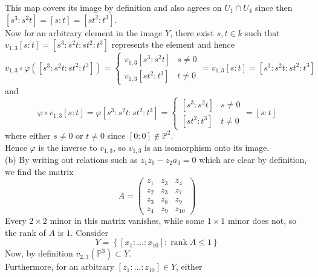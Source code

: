 \documentclass[a4paper]{article}
\DeclareMathOperator{\rank}{rank}
\begin{document}
     This map covers its image by definition and 
     also agrees on $U_1 \cap U_4$ since
     then
     $\left[ s^3 : s^2 t \right] 
     = \left[ s : t \right] 
     = \left[ s t^2 : t^3\right] $.\\
     \linebreak
     Now for an arbitrary element in the
     image $Y$, there exist $s,t \in k$ such that
     $v_{1,3} [s:t] = 
     \left[ s^3 : s^2 t : s t^2 : t^3 \right] $ represents
     the element and hence
     \[
     v_{1,3} \circ \varphi
     (\left[ s^3 : s^2 t : s t^2 : t^3 \right] )
     = \begin{cases}
         v_{1,3} \left[ s^3 : s^2 t \right] & s\neq 0\\
         v_{1,3} \left[ s t^2  : t^3 \right] & t\neq 0
     \end{cases}
     = v_{1,3} \left[ s : t \right] 
     = \left[ s^3 : s^2 t : s t^2 : t^3 \right]     
     \] 
     and
     \[
     \varphi \circ v_{1,3} \left[ s:t \right] 
     = \varphi \left[ s^3 : s^2 t : s t^2 : t^3 \right] 
     = \begin{cases}
         \left[ s^3 : s^2 t \right] & s\neq 0\\
         \left[ s t^2 : t^3 \right] & t\neq 0
     \end{cases}
     = \left[ s:t \right] 
     \] 
     where either $s \neq 0$ or $t \neq 0$ since
     $\left[ 0 : 0 \right]  \not\in  \mathbb{P}^2$.\\
     Hence $\varphi$ is the inverse to $v_{1,3}$, so
     $v_{1,3}$ is an isomorphism onto its image.\\
     \linebreak
     (b) By writing out relations such as
     $z_1 z_6 - z_2 a_3 = 0$ which are clear by definition, we
     find the matrix
     \[
         A = \begin{pmatrix} z_1 & z_3 & z_4\\
         z_2 & z_3 & z_7\\
     z_3 & z_8 & z_9\\
 z_4 & z_9 & z_{10}
\end{pmatrix} 
     \] 
     Every $2\times 2$ minor in this matrix vanishes, while 
     some $1\times 1$ minor does not, so
     the rank of $A$ is $1$. Consider
     \[
     Y = \left\{ \left[ x_1 : \ldots : x_{10} \right] 
      \colon 
  \rank A \le 1 \right\} 
     \] 
    Now, by definition
    $v_{2,3} (\mathbb{P}^3) \subset 
    Y$.\\
    Furthermore, for an arbitrary
    $\left[ z_1 : \ldots : z_{10} \right] \in Y$, either
\end{document}
